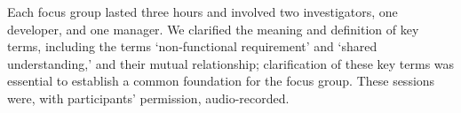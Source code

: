 \documentclass[smallextended]{svjour3}        %
\begin{document}
Each focus group lasted three hours and involved two investigators, one developer, and one manager.
We clarified the meaning and definition of key terms, including the terms `non-functional requirement' and `shared understanding,'  
and their mutual relationship; clarification of these key terms was essential to establish a common foundation for the focus group.
These sessions were, with participants' permission, audio-recorded. 











\end{document}
